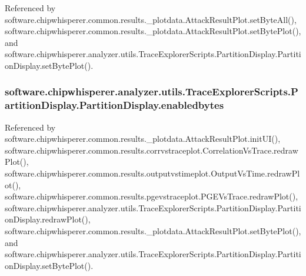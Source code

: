 Referenced by software.\+chipwhisperer.\+common.\+results.\+\_\+plotdata.\+Attack\+Result\+Plot.\+set\+Byte\+All(), software.\+chipwhisperer.\+common.\+results.\+\_\+plotdata.\+Attack\+Result\+Plot.\+set\+Byte\+Plot(), and software.\+chipwhisperer.\+analyzer.\+utils.\+Trace\+Explorer\+Scripts.\+Partition\+Display.\+Partition\+Display.\+set\+Byte\+Plot().

\hypertarget{classsoftware_1_1chipwhisperer_1_1analyzer_1_1utils_1_1TraceExplorerScripts_1_1PartitionDisplay_1_1PartitionDisplay_a64d82c9bb535b3e6468f194c1a85e988}{}
\subsubsection[{enabledbytes}]{\setlength{\rightskip}{0pt plus 5cm}software.\+chipwhisperer.\+analyzer.\+utils.\+Trace\+Explorer\+Scripts.\+Partition\+Display.\+Partition\+Display.\+enabledbytes}\label{classsoftware_1_1chipwhisperer_1_1analyzer_1_1utils_1_1TraceExplorerScripts_1_1PartitionDisplay_1_1PartitionDisplay_a64d82c9bb535b3e6468f194c1a85e988}


Referenced by software.\+chipwhisperer.\+common.\+results.\+\_\+plotdata.\+Attack\+Result\+Plot.\+init\+U\+I(), software.\+chipwhisperer.\+common.\+results.\+corrvstraceplot.\+Correlation\+Vs\+Trace.\+redraw\+Plot(), software.\+chipwhisperer.\+common.\+results.\+outputvstimeplot.\+Output\+Vs\+Time.\+redraw\+Plot(), software.\+chipwhisperer.\+common.\+results.\+pgevstraceplot.\+P\+G\+E\+Vs\+Trace.\+redraw\+Plot(), software.\+chipwhisperer.\+analyzer.\+utils.\+Trace\+Explorer\+Scripts.\+Partition\+Display.\+Partition\+Display.\+redraw\+Plot(), software.\+chipwhisperer.\+common.\+results.\+\_\+plotdata.\+Attack\+Result\+Plot.\+set\+Byte\+Plot(), and software.\+chipwhisperer.\+analyzer.\+utils.\+Trace\+Explorer\+Scripts.\+Partition\+Display.\+Partition\+Display.\+set\+Byte\+Plot().

\hypertarget{classsoftware_1_1chipwhisperer_1_1analyzer_1_1utils_1_1TraceExplorerScripts_1_1PartitionDisplay_1_1PartitionDisplay_ac0d668dfc4c5f67c8ae4b60eb07c18e7}{}
